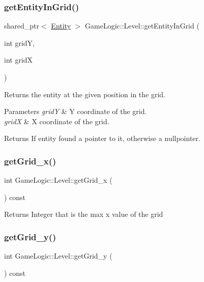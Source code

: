 \subsubsection{\texorpdfstring{get\+Entity\+In\+Grid()}{getEntityInGrid()}}
{\footnotesize\ttfamily shared\+\_\+ptr$<$ \hyperlink{classGameLogic_1_1Entity}{Entity} $>$ Game\+Logic\+::\+Level\+::get\+Entity\+In\+Grid (\begin{DoxyParamCaption}\item[{int}]{gridY,  }\item[{int}]{gridX }\end{DoxyParamCaption})}

Returns the entity at the given position in the grid. 
\begin{DoxyParams}{Parameters}
{\em gridY} & Y coordinate of the grid. \\
\hline
{\em gridX} & X coordinate of the grid. \\
\hline
\end{DoxyParams}
\begin{DoxyReturn}{Returns}
If entity found a pointer to it, otherwise a nullpointer. 
\end{DoxyReturn}
\mbox{\label{classGameLogic_1_1Level_a3c233a241cf2ea7a231186acf2301ec3}} 
\subsubsection{\texorpdfstring{get\+Grid\+\_\+x()}{getGrid\_x()}}
{\footnotesize\ttfamily int Game\+Logic\+::\+Level\+::get\+Grid\+\_\+x (\begin{DoxyParamCaption}{ }\end{DoxyParamCaption}) const}

\begin{DoxyReturn}{Returns}
Integer that is the max x value of the grid 
\end{DoxyReturn}
\mbox{\label{classGameLogic_1_1Level_a72e96cb117a1de175c2c91eb953f5b74}} 
\subsubsection{\texorpdfstring{get\+Grid\+\_\+y()}{getGrid\_y()}}
{\footnotesize\ttfamily int Game\+Logic\+::\+Level\+::get\+Grid\+\_\+y (\begin{DoxyParamCaption}{ }\end{DoxyParamCaption}) const}

